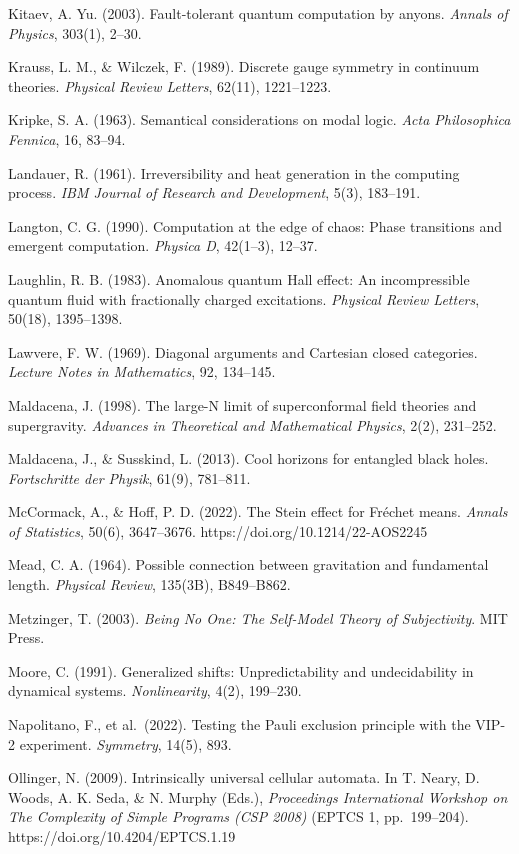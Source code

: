 \documentclass[
]{article}
\begin{document}
Kitaev, A. Yu. (2003). Fault-tolerant quantum computation by anyons.
\emph{Annals of Physics}, 303(1), 2--30.

Krauss, L. M., \& Wilczek, F. (1989). Discrete gauge symmetry in
continuum theories. \emph{Physical Review Letters}, 62(11), 1221--1223.

Kripke, S. A. (1963). Semantical considerations on modal logic.
\emph{Acta Philosophica Fennica}, 16, 83--94.

Landauer, R. (1961). Irreversibility and heat generation in the
computing process. \emph{IBM Journal of Research and Development}, 5(3),
183--191.

Langton, C. G. (1990). Computation at the edge of chaos: Phase
transitions and emergent computation. \emph{Physica D}, 42(1--3),
12--37.

Laughlin, R. B. (1983). Anomalous quantum Hall effect: An incompressible
quantum fluid with fractionally charged excitations. \emph{Physical
Review Letters}, 50(18), 1395--1398.

Lawvere, F. W. (1969). Diagonal arguments and Cartesian closed
categories. \emph{Lecture Notes in Mathematics}, 92, 134--145.

Maldacena, J. (1998). The large-N limit of superconformal field theories
and supergravity. \emph{Advances in Theoretical and Mathematical
Physics}, 2(2), 231--252.

Maldacena, J., \& Susskind, L. (2013). Cool horizons for entangled black
holes. \emph{Fortschritte der Physik}, 61(9), 781--811.

McCormack, A., \& Hoff, P. D. (2022). The Stein effect for Fréchet
means. \emph{Annals of Statistics}, 50(6), 3647--3676.
https://doi.org/10.1214/22-AOS2245

Mead, C. A. (1964). Possible connection between gravitation and
fundamental length. \emph{Physical Review}, 135(3B), B849--B862.

Metzinger, T. (2003). \emph{Being No One: The Self-Model Theory of
Subjectivity}. MIT Press.

Moore, C. (1991). Generalized shifts: Unpredictability and
undecidability in dynamical systems. \emph{Nonlinearity}, 4(2),
199--230.

Napolitano, F., et al.~(2022). Testing the Pauli exclusion principle
with the VIP-2 experiment. \emph{Symmetry}, 14(5), 893.

Ollinger, N. (2009). Intrinsically universal cellular automata. In T.
Neary, D. Woods, A. K. Seda, \& N. Murphy (Eds.), \emph{Proceedings
International Workshop on The Complexity of Simple Programs (CSP 2008)}
(EPTCS 1, pp.~199--204). https://doi.org/10.4204/EPTCS.1.19
\end{document}
